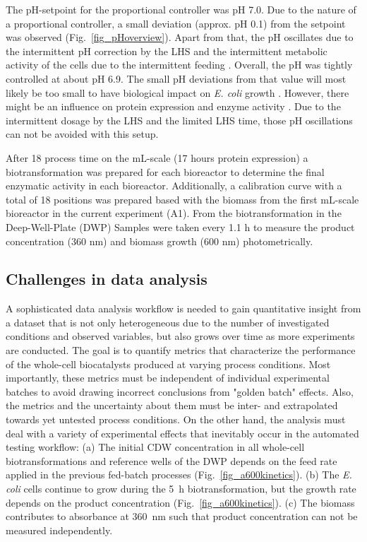 \documentclass[sn-standardnature]{sn-jnl}%
\theoremstyle{thmstyleone}%
\theoremstyle{thmstyletwo}%
\theoremstyle{thmstylethree}%
\begin{document}
The pH-setpoint for the proportional controller was pH 7.0.
Due to the nature of a proportional controller, a small deviation (approx. pH 0.1) from the setpoint was observed (Fig.~\ref{fig_pHoverview}).
Apart from that, the pH oscillates due to the intermittent pH correction by the LHS and the intermittent metabolic activity of the cells due to the intermittent feeding \cite{kim2004high}.
Overall, the pH was tightly controlled at about pH 6.9.
The small pH deviations from that value will most likely be too small to have biological impact on \textit{E. coli} growth \cite{presser1997modelling,gale1942effect}.
However, there might be an influence on protein expression and enzyme activity \cite{cui2009influence,strandberg1991factors}.
Due to the intermittent dosage by the LHS and the limited LHS time, those pH oscillations can not be avoided with this setup.

After 18 process time on the mL-scale (17 hours protein expression) a biotransformation was prepared for each bioreactor to determine the final enzymatic activity in each bioreactor.
Additionally, a calibration curve with a total of 18 positions was prepared based with the biomass from the first mL-scale bioreactor in the current experiment (A1).
From the biotransformation in the Deep-Well-Plate (DWP) Samples were taken every 1.1 h to measure the product concentration (360 nm) and biomass growth (600 nm) photometrically.

\subsection{Challenges in data analysis}
A sophisticated data analysis workflow is needed to gain quantitative insight from a dataset that is not only heterogeneous due to the number of investigated conditions and observed variables, but also grows over time as more experiments are conducted.
The goal is to quantify metrics that characterize the performance of the whole-cell biocatalysts produced at varying process conditions.
Most importantly, these metrics must be independent of individual experimental batches to avoid drawing incorrect conclusions from "golden batch" effects.
Also, the metrics and the uncertainty about them must be inter- and extrapolated towards yet untested process conditions.
On the other hand, the analysis must deal with a variety of experimental effects that inevitably occur in the automated testing workflow:
(a) The initial CDW concentration in all whole-cell biotransformations and reference wells of the DWP depends on the feed rate applied in the previous fed-batch processes (Fig.~\ref{fig_a600kinetics}).
(b) The \textit{E. coli} cells continue to grow during the 5~h biotransformation, but the growth rate depends on the product concentration (Fig.~\ref{fig_a600kinetics}).
(c) The biomass contributes to absorbance at 360~nm such that product concentration can not be measured independently.
\end{document}
